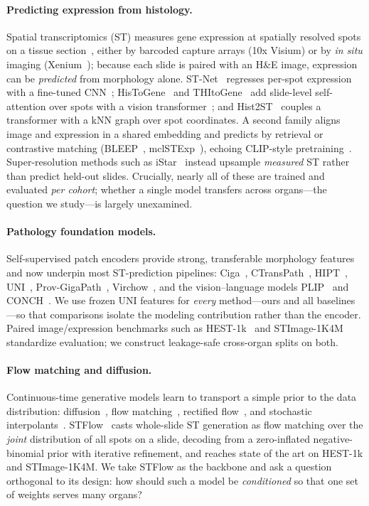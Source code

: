 \documentclass[10pt,twocolumn,letterpaper]{article}
\begin{document}
\paragraph{Predicting expression from histology.}
Spatial transcriptomics (ST) measures gene expression at spatially resolved spots on a tissue
section~\cite{spatialtx}, either by barcoded capture arrays (10x Visium) or by \emph{in situ}
imaging (Xenium~\cite{xenium}); because each slide is paired with an H\&E image, expression can be
\emph{predicted} from morphology alone. ST-Net~\cite{stnet} regresses per-spot expression with a
fine-tuned CNN~\cite{resnet}; HisToGene~\cite{histogene} and THItoGene~\cite{thitogene} add
slide-level self-attention over spots with a vision transformer~\cite{vit,transformer};
and Hist2ST~\cite{hist2st} couples a transformer with a kNN graph over spot coordinates.
A second family aligns image and expression in a shared embedding and predicts by
retrieval or contrastive matching (BLEEP~\cite{bleep}, mclSTExp~\cite{mclstexp}), echoing
CLIP-style pretraining~\cite{clip}. Super-resolution methods such as iStar~\cite{istar} instead
upsample \emph{measured} ST rather than predict held-out slides. Crucially, nearly all of these are
trained and evaluated \emph{per cohort}; whether a single model transfers across organs---the
question we study---is largely unexamined.

\paragraph{Pathology foundation models.}
Self-supervised patch encoders provide strong, transferable morphology features and now underpin
most ST-prediction pipelines: Ciga~\cite{ciga}, CTransPath~\cite{ctranspath}, HIPT~\cite{hipt},
UNI~\cite{uni}, Prov-GigaPath~\cite{gigapath}, Virchow~\cite{virchow}, and the vision--language
models PLIP~\cite{plip} and CONCH~\cite{conch}.
We use frozen UNI features for \emph{every} method---ours and all baselines---so that comparisons
isolate the modeling contribution rather than the encoder. Paired image/expression benchmarks such
as HEST-1k~\cite{hest} and STImage-1K4M~\cite{stimage} standardize evaluation; we construct
leakage-safe cross-organ splits on both.

\paragraph{Flow matching and diffusion.}
Continuous-time generative models learn to transport a simple prior to the data distribution:
diffusion~\cite{ddpm}, flow matching~\cite{flowmatching}, rectified flow~\cite{rectifiedflow}, and
stochastic interpolants~\cite{interpolants}. STFlow~\cite{stflow} casts whole-slide ST generation
as flow matching over the \emph{joint} distribution of all spots on a slide, decoding from a
zero-inflated negative-binomial prior with iterative refinement, and reaches state of the art on
HEST-1k and STImage-1K4M. We take STFlow as the backbone and ask a question orthogonal to its
design: how should such a model be \emph{conditioned} so that one set of weights serves many organs?
\end{document}
